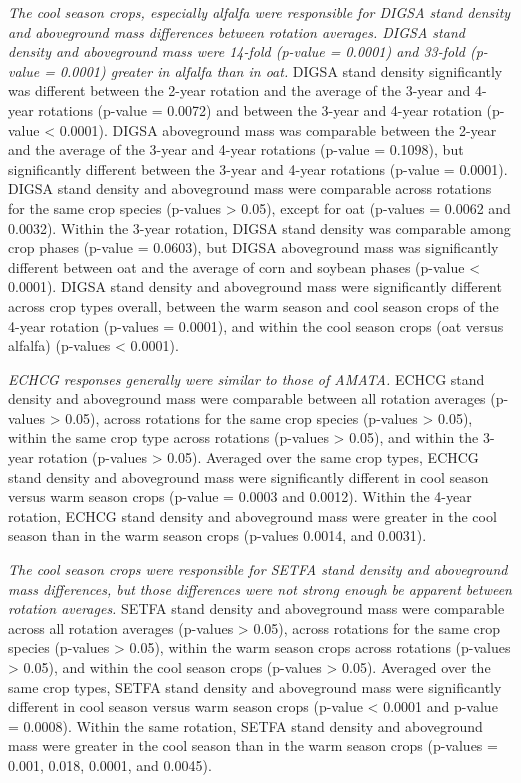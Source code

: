 \documentclass[
]{article}
\begin{document}
\emph{The cool season crops, especially alfalfa were responsible for DIGSA stand density and aboveground mass differences between rotation averages. DIGSA stand density and aboveground mass were 14-fold (p-value = 0.0001) and 33-fold (p-value = 0.0001) greater in alfalfa than in oat.} DIGSA stand density significantly was different between the 2-year rotation and the average of the 3-year and 4-year rotations (p-value = 0.0072) and between the 3-year and 4-year rotation (p-value \textless{} 0.0001). DIGSA aboveground mass was comparable between the 2-year and the average of the 3-year and 4-year rotations (p-value = 0.1098), but significantly different between the 3-year and 4-year rotations (p-value = 0.0001). DIGSA stand density and aboveground mass were comparable across rotations for the same crop species (p-values \textgreater{} 0.05), except for oat (p-values = 0.0062 and 0.0032). Within the 3-year rotation, DIGSA stand density was comparable among crop phases (p-value = 0.0603), but DIGSA aboveground mass was significantly different between oat and the average of corn and soybean phases (p-value \textless{} 0.0001). DIGSA stand density and aboveground mass were significantly different across crop types overall, between the warm season and cool season crops of the 4-year rotation (p-values = 0.0001), and within the cool season crops (oat versus alfalfa) (p-values \textless{} 0.0001).

\emph{ECHCG responses generally were similar to those of AMATA.} ECHCG stand density and aboveground mass were comparable between all rotation averages (p-values \textgreater{} 0.05), across rotations for the same crop species (p-values \textgreater{} 0.05), within the same crop type across rotations (p-values \textgreater{} 0.05), and within the 3-year rotation (p-values \textgreater{} 0.05). Averaged over the same crop types, ECHCG stand density and aboveground mass were significantly different in cool season versus warm season crops (p-value = 0.0003 and 0.0012). Within the 4-year rotation, ECHCG stand density and aboveground mass were greater in the cool season than in the warm season crops (p-values 0.0014, and 0.0031).

\emph{The cool season crops were responsible for SETFA stand density and aboveground mass differences, but those differences were not strong enough be apparent between rotation averages.} SETFA stand density and aboveground mass were comparable across all rotation averages (p-values \textgreater{} 0.05), across rotations for the same crop species (p-values \textgreater{} 0.05), within the warm season crops across rotations (p-values \textgreater{} 0.05), and within the cool season crops (p-values \textgreater{} 0.05). Averaged over the same crop types, SETFA stand density and aboveground mass were significantly different in cool season versus warm season crops (p-value \textless{} 0.0001 and p-value = 0.0008). Within the same rotation, SETFA stand density and aboveground mass were greater in the cool season than in the warm season crops (p-values = 0.001, 0.018, 0.0001, and 0.0045).
\end{document}
